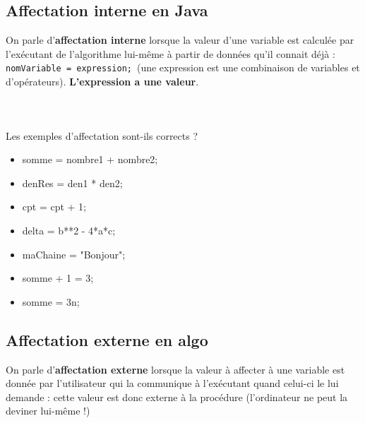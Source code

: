 \documentclass[11pt,a4paper]{article}
\begin{document}
        \subsection{Affectation interne en Java}
          On parle d'\textbf{affectation interne} lorsque la valeur d'une variable est \guillemotleft  calcul\'ee \guillemotright  par l'ex\'ecutant
          de l'algorithme lui-m\^eme \`a partir de donn\'ees qu'il connait d\'ej\`a :
          \,\verb|nomVariable = expression;|\,
          (une expression est une combinaison de variables et d'op\'erateurs). \textbf{L'expression a une valeur}.
        
            \par
        
			
		\subparagraph{} 
		
                \textcolor{white}{.} \par
            Les exemples d'affectation sont-ils corrects ?
						
            \begin{itemize} 
        
            \item[ \ding{"6F} ] somme = nombre1 + nombre2;
        
            \item[ \ding{"6F} ] denRes = den1 * den2;
        
            \item[ \ding{"6F} ] cpt = cpt + 1;
        
            \item[ \ding{"6F} ] delta = b**2 - 4*a*c;
        
            \item[ \ding{"6F} ] maChaine = "Bonjour";
        
            \item[ \ding{"6F} ] somme + 1 = 3;
        
            \item[ \ding{"6F} ] somme = 3n;
        
            \end{itemize} 
        \subsection{Affectation externe en algo}
          On parle d'\textbf{affectation externe} lorsque la valeur \`a affecter \`a une variable
           est donn\'ee par l'utilisateur qui la communique \`a l'ex\'ecutant quand celui-ci le lui demande : cette valeur est
          donc externe \`a la proc\'edure (l'ordinateur ne peut la deviner lui-m\^eme !)
        
\end{document}
